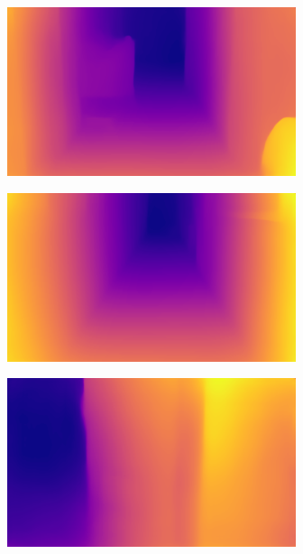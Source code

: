\begin{figure}[H]
\begin{subfigure}{0.32\textwidth}
        \vspace{0.5em}
    \end{subfigure}
    \begin{subfigure}{0.32\textwidth}
        \centering
        \includegraphics[width=\textwidth]{resources/png/07/depth/results/0.png}
    \end{subfigure}
    \hfill
    \begin{subfigure}{0.32\textwidth}
        \centering
        \includegraphics[width=\textwidth]{resources/png/07/depth/results/1.png}
    \end{subfigure}
    \hfill
    \begin{subfigure}{0.32\textwidth}
        \centering
        \includegraphics[width=\textwidth]{resources/png/07/depth/results/2.png}

\end{subfigure}
\end{figure}
